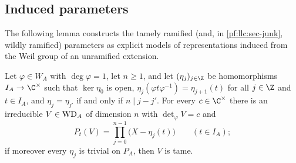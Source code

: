 \subsection{Induced parameters}\label{pf:llc:sec-ind}

The following lemma constructs the tamely ramified (and, in \cref{pf:llc:sec-junk}, wildly ramified)
parameters as explicit models of representations induced from the Weil group of an unramified extension.

\begin{lemma}\label{pf:llc:index}
Let $\varphi\in W_A$ with $\deg\varphi=1$, let $n\ge1$, and let $(\eta_j)_{j\in\Z}$ be homomorphisms $I_A\to\C^\times$
such that $\ker\eta_0$ is open, $\eta_j(\varphi t\varphi^{-1})=\eta_{j+1}(t)$ for all $j\in\Z$ and $t\in I_A$, and
$\eta_j=\eta_{j'}$ if and only if $n\mid j-j'$. For every $c\in\C^\times$ there is an irreducible $V\in\mathrm{WD}_A$ of
dimension $n$ with $\det_\varphi V=c$ and
\[
  P_t(V)=\prod_{j=0}^{n-1}\bigl(X-\eta_j(t)\bigr)\qquad(t\in I_A);
\]
if moreover every $\eta_j$ is trivial on $P_A$, then $V$ is tame. 
\end{lemma}

